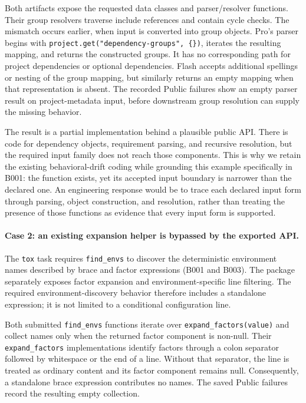\documentclass[acmsmall,screen,review,anonymous,nonacm]{acmart}
\begin{document}
Both artifacts expose the requested data classes and parser/resolver functions.
Their group resolvers traverse include references and contain cycle checks.
The mismatch occurs earlier, when input is converted into group objects. Pro's
parser begins with
\texttt{project.get("dependency-groups", \{\})}, iterates the resulting mapping,
and returns the constructed groups. It has no corresponding path for project
dependencies or optional dependencies. Flash accepts additional spellings or
nesting of the group mapping, but similarly returns an empty mapping when that
representation is absent. The recorded Public failures show an empty parser
result on project-metadata input, before downstream group resolution can supply
the missing behavior.

The result is a partial implementation behind a plausible public API. There is
code for dependency objects, requirement parsing, and recursive resolution, but
the required input family does not reach those components. This is why we retain
the existing behavioral-drift coding while grounding this example specifically
in B001: the function exists, yet its accepted input boundary is narrower than
the declared one. An engineering response would be to trace each declared input
form through parsing, object construction, and resolution, rather than treating
the presence of those functions as evidence that every input form is supported.

\paragraph{Case 2: an existing expansion helper is bypassed by the exported API.}
The \texttt{tox} task requires \texttt{find\_envs} to discover the deterministic
environment names described by brace and factor expressions (B001 and B003).
The package separately exposes factor expansion and environment-specific line
filtering. The required environment-discovery behavior therefore includes a
standalone expression; it is not limited to a conditional configuration line.

Both submitted \texttt{find\_envs} functions iterate over
\texttt{expand\_factors(value)} and collect names only when the returned factor
component is non-null. Their \texttt{expand\_factors} implementations identify
factors through a colon separator followed by whitespace or the end of a line.
Without that separator, the line is treated as ordinary content and its factor
component remains null. Consequently, a standalone brace expression contributes
no names. The saved Public failures record the resulting empty collection.
\end{document}
